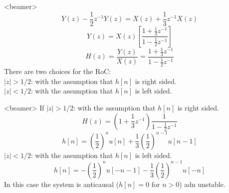 \begin{frame}<beamer>
    \begin{equation*}
        Y(z) - \frac{1}{2} z^{-1}Y(z) = X(z) + \frac{1}{3} z^{-1}X(z)
    \end{equation*}
    \pause
    \begin{equation*}
        Y(z)  = X(z)\left[\frac{1+\frac{1}{3} z^{-1}}{1 - \frac{1}{2} z^{-1}}\right] 
    \end{equation*}
    \pause
    \begin{equation*}
        H(z)  = \frac{Y(z)}{X(z)} = \frac{1+\frac{1}{3} z^{-1}}{1 - \frac{1}{2} z^{-1}}
    \end{equation*}    
    There are two choices for the RoC:\\
    $|z| > 1/2$: with the assumption that $h[n]$ is right sided.\\
    $|z| < 1/2$: with the assumption that $h[n]$ is left sided.\\
\end{frame}

\begin{frame}<beamer>
    If $|z| > 1/2$: with the assumption that $h[n]$ is right sided.\\
    \begin{equation*}
        H(z) = \left(1+\frac{1}{3} z^{-1}\right)\frac{1}{1 - \frac{1}{2} z^{-1}}
    \end{equation*}
    \pause
     \begin{equation*}
        h[n] = \left( \frac{1}{2}\right)^nu[n] + \frac{1}{3}\left( \frac{1}{2}\right)^{n-1}u[n-1]
     \end{equation*}
     \pause
    $|z| < 1/2$: with the assumption that $h[n]$ is left sided.\\
     \begin{equation*}
        h[n] = -\left( \frac{1}{2}\right)^nu[-n-1] - \frac{1}{3}\left( \frac{1}{2}\right)^{n-1}u[-n]
     \end{equation*}
     In this case the system is anticausal ($h[n] =0$ for $n>0$) adn unstable.
\end{frame}